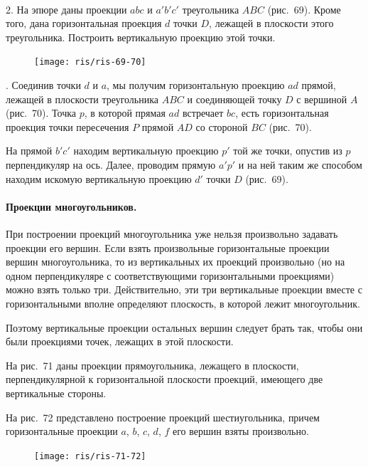 \documentclass[twoside]{book}
\begin{document}
\paragraph{}\label{1938/s64}
 2.
На эпюре даны проекции $abc$ и $a'b'c'$ треугольника $ABC$ (рис.~69).
Кроме того, дана горизонтальная проекция $d$ точки $D$, лежащей в плоскости этого треугольника.
Построить вертикальную проекцию этой точки.

\begin{figure}[h!]
\centering
\texttt{[image: ris/ris-69-70]}
\caption{}
\end{figure}

.
Соединив точки $d$ и $a$, мы получим горизонтальную проекцию $ad$ прямой, лежащей в плоскости треугольника $ABC$ и соединяющей точку $D$ с вершиной $A$ (рис.~70).
Точка $p$, в которой прямая $ad$ встречает $bc$, есть горизонтальная проекция точки пересечения $P$ прямой $AD$ со стороной $BC$ (рис.~70).

На прямой $b'c'$ находим вертикальную проекцию $p'$ той же точки, опустив из $p$ перпендикуляр на ось.
Далее, проводим прямую $a'p'$ и на ней таким же способом находим искомую вертикальную проекцию $d'$ точки $D$ (рис.~69).

\paragraph{Проекции многоугольников.}\label{1938/s65}
При построении проекций многоугольника уже нельзя произвольно задавать проекции его вершин.
Если взять произвольные горизонтальные проекции вершин многоугольника, то из вертикальных их проекций произвольно (но на одном перпендикуляре с соответствующими горизонтальными проекциями) можно взять только три.
Действительно, эти три вертикальные проекции вместе с горизонтальными вполне определяют плоскость, в которой лежит многоугольник.

Поэтому вертикальные проекции остальных вершин следует брать так, чтобы они были проекциями точек, лежащих в этой плоскости.

На рис.~71 даны проекции прямоугольника, лежащего в плоскости, перпендикулярной к горизонтальной плоскости проекций, имеющего две вертикальные стороны.

На рис.~72 представлено построение проекций шестиугольника, причем горизонтальные проекции $a$, $b$, $c$, $d$, $f$ его вершин взяты произвольно.

\begin{figure}[h!]
\centering
\texttt{[image: ris/ris-71-72]}
\caption{}
\end{figure}
\end{document}
